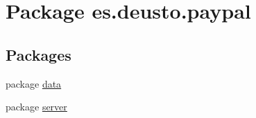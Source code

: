 \hypertarget{namespacees_1_1deusto_1_1paypal}{}\section{Package es.\+deusto.\+paypal}
\label{namespacees_1_1deusto_1_1paypal}
\subsection*{Packages}
\begin{DoxyCompactItemize}
\item 
package \mbox{\hyperlink{namespacees_1_1deusto_1_1paypal_1_1data}{data}}
\item 
package \mbox{\hyperlink{namespacees_1_1deusto_1_1paypal_1_1server}{server}}
\end{DoxyCompactItemize}
